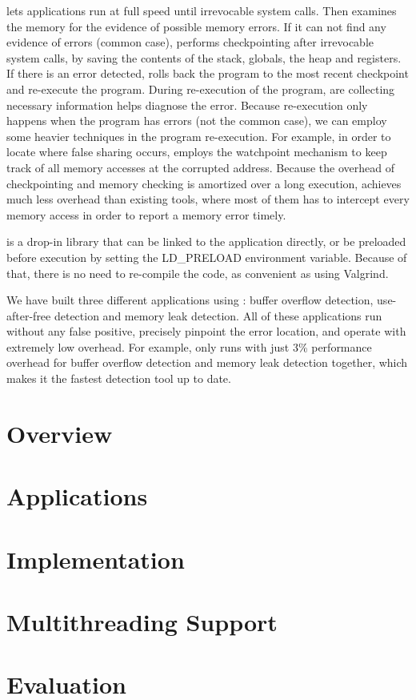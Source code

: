 \doubletake{} lets applications run at full speed until irrevocable system calls. Then \doubletake{} examines the memory for the evidence of possible memory errors. If it can not find any evidence of errors (common case), \doubletake{} performs checkpointing after irrevocable system calls, by saving the contents of the stack, globals, the heap and registers.  If there is an error detected, \doubletake{} rolls back the program to the most recent checkpoint and re-execute the program. During re-execution of the program, \doubletake{} are collecting necessary information helps diagnose the error. Because re-execution only happens when the program has errors (not the common case), we can employ some heavier techniques in the program re-execution. For example, in order to locate where false sharing occurs, \doubletake{} employs the watchpoint mechanism to keep track of all memory accesses at the corrupted address. Because the overhead of checkpointing and memory checking is amortized over a long execution, \doubletake{} achieves much less overhead than existing tools, where most of them has to intercept every memory access in order to report a memory error timely.

\doubletake{} is a drop-in library that can be linked to the application directly, or be preloaded before execution by setting the LD\_PRELOAD environment variable. 
Because of that, there is no need to re-compile the code, as convenient as using Valgrind.     

We have built three different applications using \doubletake{}: buffer overflow detection, use-after-free detection and memory leak detection. All of these applications run without any false positive, precisely pinpoint the error location, and operate with extremely low overhead. For example, \doubletake{} only runs with just 3\% performance overhead for buffer overflow detection and memory leak detection together, which makes it the fastest detection tool up to date. 

\section{Overview}


\section{Applications}


\section{Implementation} 


\section{Multithreading Support}


\section{Evaluation}

